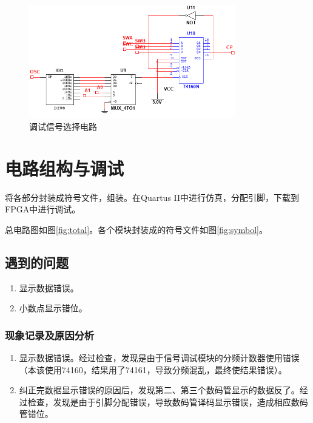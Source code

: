\documentclass[12pt]{article}
\begin{document}
\begin{figure}[H]
    \centering
    \includegraphics[width=0.8\textwidth]{./fig/signal.png}
    \caption{调试信号选择电路}
    \label{fig:signal}
\end{figure}

\section{电路组构与调试}

将各部分封装成符号文件，组装。在Quartus II中进行仿真，分配引脚，下载到FPGA中进行调试。

总电路图如图\ref*{fig:total}。各个模块封装成的符号文件如图\ref*{fig:symbol}。

\subsection{遇到的问题}

\begin{enumerate}
    \item 显示数据错误。
    \item 小数点显示错位。
\end{enumerate}

\subsubsection*{现象记录及原因分析}

\begin{enumerate}
    \item 显示数据错误。经过检查，发现是由于信号调试模块的分频计数器使用错误（本该使用74160，结果用了74161，导致分频混乱，最终使结果错误）。
    \item 纠正完数据显示错误的原因后，发现第二、第三个数码管显示的数据反了。经过检查，发现是由于引脚分配错误，导致数码管译码显示错误，造成相应数码管错位。
\end{enumerate}
\end{document}
